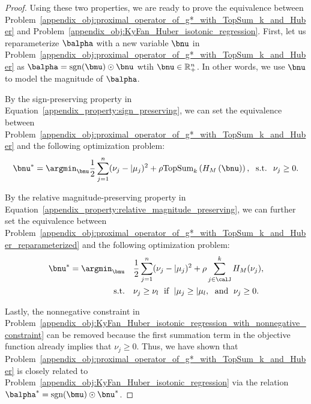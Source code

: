 \begin{proof}
Using these two properties, we are ready to prove the equivalence between Problem~\eqref{appendix_obj:proximal_operator_of_g*_with_TopSum_k_and_Huber} and Problem~\eqref{appendix_obj:KyFan_Huber_isotonic_regression}.
First, let us reparameterize $\balpha$ with a new variable $\bnu$ in Problem~\eqref{appendix_obj:proximal_operator_of_g*_with_TopSum_k_and_Huber} as $\balpha = \text{sgn}(\bmu) \odot \bnu$ wtih $\bnu \in \mathbb{R}_{+}^n$.
In other words, we use $\bnu$ to model the magnitude of $\balpha$.

By the sign-preserving property in Equation~\eqref{appendix_property:sign_preserving}, we can set the equivalence between Problem~\eqref{appendix_obj:proximal_operator_of_g*_with_TopSum_k_and_Huber} and the following optimization problem:
\begin{align}
    \label{appendix_obj:proximal_operator_of_g*_with_TopSum_k_and_Huber_reparameterized}
    \bnu^* = \argmin_{\bnu} \frac{1}{2} \sum_{j=1}^n (\nu_j - \vert{\mu_j})^2 + \rho \text{TopSum}_k\left( H_M\left( \bnu \right) \right), \; \text{ s.t. } \; \nu_j \geq 0.
\end{align}

By the relative magnitude-preserving property in Equation~\eqref{appendix_property:relative_magnitude_preserving}, we can further set the equivalence between Problem~\eqref{appendix_obj:proximal_operator_of_g*_with_TopSum_k_and_Huber_reparameterized} and the following optimization problem:
\begin{align}
    \label{appendix_obj:KyFan_Huber_isotonic_regression_with_nonnegative_constraint}
    \bnu^* = \argmin_{\bnu} & \quad \frac{1}{2} \sum_{j=1}^n (\nu_j - \vert{\mu_j})^2 + \rho \sum_{j \in \calJ}^k H_M (\nu_j), \\
    \text{s.t.} & \quad \nu_j \geq \nu_l \; \text{ if } \; \vert{\mu_j} \geq \vert{\mu_l}, \; \text{ and } \; \nu_j \geq 0. \nonumber
\end{align}

Lastly, the nonnegative constraint in Problem~\eqref{appendix_obj:KyFan_Huber_isotonic_regression_with_nonnegative_constraint} can be removed because the first summation term in the objective function already implies that $\nu_j \geq 0$.
Thus, we have shown that Problem~\eqref{appendix_obj:proximal_operator_of_g*_with_TopSum_k_and_Huber} is closely related to Problem~\eqref{appendix_obj:KyFan_Huber_isotonic_regression} via the relation $\balpha^* = \text{sgn}(\bmu) \odot \bnu^*$.



\end{proof}
